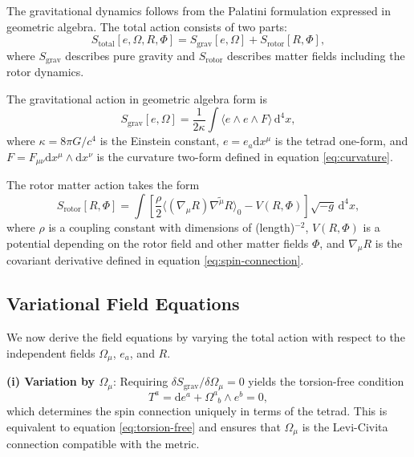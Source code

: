 \documentclass[11pt,a4paper]{article}
\numberwithin{equation}{section}
\theoremstyle{plain}
\theoremstyle{definition}
\theoremstyle{remark}
\newcommand{\dd}{\mathrm{d}}
\begin{document}
The gravitational dynamics follows from the Palatini formulation expressed in geometric algebra. The total action consists of two parts:
\begin{equation}
S_{\mathrm{total}}[e,\Omega,R,\Phi] = S_{\mathrm{grav}}[e,\Omega] + S_{\mathrm{rotor}}[R,\Phi],
\label{eq:action}
\end{equation}
where $S_{\mathrm{grav}}$ describes pure gravity and $S_{\mathrm{rotor}}$ describes matter fields including the rotor dynamics.

The gravitational action in geometric algebra form is
\begin{equation}
S_{\mathrm{grav}}[e,\Omega] = \frac{1}{2\kappa} \int \langle e \wedge e \wedge F \rangle \, \dd^4x,
\label{eq:palatini-action}
\end{equation}
where $\kappa = 8\pi G/c^4$ is the Einstein constant, $e = e_a \dd x^\mu$ is the tetrad one-form, and $F = F_{\mu\nu} \dd x^\mu \wedge \dd x^\nu$ is the curvature two-form defined in equation \eqref{eq:curvature}.

The rotor matter action takes the form
\begin{equation}
S_{\mathrm{rotor}}[R,\Phi] = \int \left[\frac{\rho}{2}\langle (\nabla_\mu R)\widetilde{\nabla^\mu R} \rangle_0 - V(R,\Phi)\right] \sqrt{-g}\, \dd^4x,
\label{eq:rotor-action}
\end{equation}
where $\rho$ is a coupling constant with dimensions of (length)$^{-2}$, $V(R,\Phi)$ is a potential depending on the rotor field and other matter fields $\Phi$, and $\nabla_\mu R$ is the covariant derivative defined in equation \eqref{eq:spin-connection}.

\subsection{Variational Field Equations}

We now derive the field equations by varying the total action with respect to the independent fields $\Omega_\mu$, $e_a$, and $R$.

\textbf{(i) Variation by $\Omega_\mu$}: Requiring $\delta S_{\mathrm{grav}}/\delta \Omega_\mu = 0$ yields the torsion-free condition
\begin{equation}
T^a = \dd e^a + \Omega^a_{\phantom{a}b} \wedge e^b = 0,
\label{eq:field-torsion}
\end{equation}
which determines the spin connection uniquely in terms of the tetrad. This is equivalent to equation \eqref{eq:torsion-free} and ensures that $\Omega_\mu$ is the Levi-Civita connection compatible with the metric.
\end{document}
